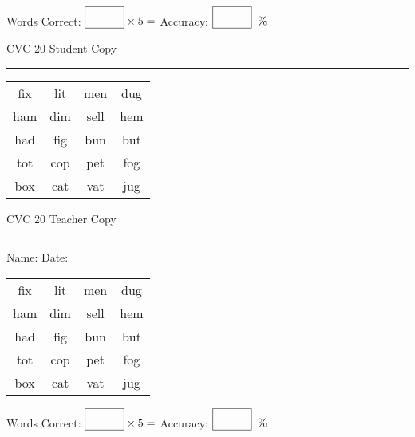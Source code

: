 \documentclass{memoir}
\begin{document}
\normalsize

Words Correct: $\fbox{\phantom{\huge 100}} \times 5 = $ Accuracy: $\fbox{\phantom{\huge 100}}\;\; \%$ 

\vfill

\newpage



\footnotesize \noindent
CVC 20 \hfill Student Copy
\smallskip
\hrule

\huge

\setlength{\tabcolsep}{14pt}
\def\arraystretch{2}

{\selectfont


\begin{vplace}[0.5]
\begin{center}
\begin{tabular}{cccc}
fix & lit & men & dug \\
ham & dim & sell & hem \\
had & fig & bun & but \\
tot & cop & pet & fog \\
box & cat & vat & jug \\
\end{tabular}
\end{center}
\end{vplace}

}

\newpage

\footnotesize \noindent
CVC 20 \hfill Teacher Copy
\smallskip
\hrule

\normalsize

\vfill

\noindent
Name: \underline{\hspace{1.75in}} \hfill Date: \underline{\hspace{1in}}

\huge

{\selectfont


\begin{vplace}[0.5]
\begin{center}
\begin{tabular}{cccc}
fix & lit & men & dug \\
ham & dim & sell & hem \\
had & fig & bun & but \\
tot & cop & pet & fog \\
box & cat & vat & jug \\
\end{tabular}
\end{center}
\end{vplace}



}

\normalsize

Words Correct: $\fbox{\phantom{\huge 100}} \times 5 = $ Accuracy: $\fbox{\phantom{\huge 100}}\;\; \%$ 

\vfill

\end{document}

